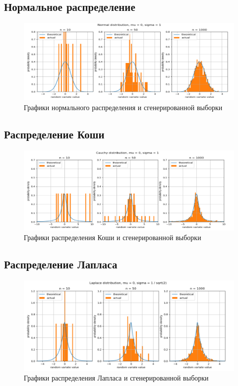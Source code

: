 \documentclass[12pt,a4paper]{article}
\begin{document}
	\subsection{Нормальное распределение}
		\begin{figure}[h]
			\centering
			\includegraphics[width=\linewidth]{MS1res/normal.png}
			\caption{Графики нормального распределения и сгенерированной выборки}
		\end{figure}
	\subsection{Распределение Коши}
		\begin{figure}[h]
			\centering
			\includegraphics[width=\linewidth]{MS1res/cauchy.png}
			\caption{Графики распределения Коши и сгенерированной выборки}
		\end{figure}
	\subsection{Распределение Лапласа}
		\begin{figure}[h]
			\centering
			\includegraphics[width=\linewidth]{MS1res/laplace.png}
			\caption{Графики распределения Лапласа и сгенерированной выборки}
		\end{figure}
\end{document}
